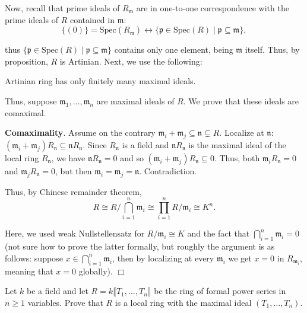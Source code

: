 \documentclass{template}
\newcommand{\qedwhite}{\hfill \ensuremath{\Box}}
\begin{document}
Now, recall that prime ideals of $R_{\mathfrak{m}}$ are in 
one-to-one correspondence with the prime ideals of $R$ contained in $\mathfrak{m}$: 
\[\{(0)\} = \text{Spec}(R_{\mathfrak{m}}) \longleftrightarrow \{ \mathfrak{p} \in
\text{Spec}(R) \mid \mathfrak{p} \subseteq \mathfrak{m} \},\]

thus $\{ \mathfrak{p} \in \text{Spec}(R) \mid \mathfrak{p} \subseteq
\mathfrak{m} \}$ contains only one element, being $\mathfrak{m}$ itself.
Thus, by proposition, $R$ is Artinian. Next, we use the following:

\begin{propositions}
    Artinian ring has only finitely many maximal ideals.
\end{propositions}

Thus, suppose $\mathfrak{m}_1,\dots,\mathfrak{m}_n$ are maximal ideals of $R$.
We prove that these ideals are comaximal.

\textbf{Comaximality}. Assume on the contrary $\mathfrak{m}_i + \mathfrak{m}_j
\subseteq \mathfrak{n} \subsetneq R$. Localize at $\mathfrak{n}$:
$(\mathfrak{m}_i + \mathfrak{m}_j)R_{\mathfrak{n}} \subseteq
\mathfrak{n}R_{\mathfrak{n}}$. Since $R_{\mathfrak{n}}$ is a field and
$\mathfrak{n}R_{\mathfrak{n}}$ is the maximal ideal of the local ring
$R_{\mathfrak{n}}$, we have $\mathfrak{n}R_{\mathfrak{n}} = 0$ and so
$(\mathfrak{m}_i + \mathfrak{m}_j)R_{\mathfrak{n}} \subseteq 0$. Thus, both
$\mathfrak{m}_iR_{\mathfrak{n}}=0$ and $\mathfrak{m}_jR_{\mathfrak{n}}=0$, but
then $\mathfrak{m}_i = \mathfrak{m}_j = \mathfrak{n}$. Contradiction.

Thus, by Chinese remainder theorem,
\begin{equation*}
    R \cong R / \bigcap_{i=1}^n \mathfrak{m}_i \cong \prod_{i=1}^n R/\mathfrak{m}_i \cong K^n.
\end{equation*}

Here, we used weak Nullstellensatz for $R/\mathfrak{m}_i \cong K$ and the fact
that $\bigcap_{i=1}^n \mathfrak{m}_i = 0$ (not sure how to prove the latter
formally, but roughly the argument is as follows: suppose $x \in \bigcap_{i=1}^n
\mathfrak{m}_i$, then by localizing at every $\mathfrak{m}_i$ we get $x=0$ in
$R_{\mathfrak{m}_i}$, meaning that $x=0$ globally). \qedwhite

\begin{problem}[Exercise 4]
    Let $k$ be a field and let $R=k\lBrack T_1,\dots, T_n \rBrack$ be the 
    ring of formal power series in $n \geq 1$ variables. Prove that $R$ is a 
    local ring with the maximal ideal $(T_1,\dots,T_n)$.
\end{problem}
\end{document}
